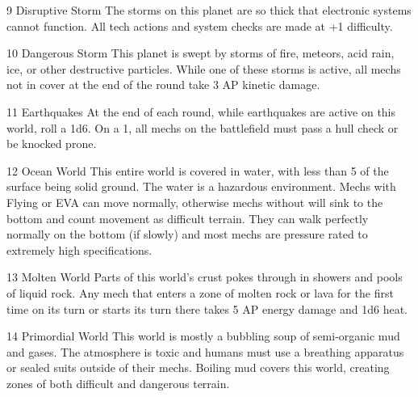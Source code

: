 9       Disruptive Storm                   The storms on this planet are so thick that electronic
                                            systems cannot function. All tech actions and system
                                            checks are made at +1 difficulty.

10      Dangerous Storm                    This planet is swept by storms of fire, meteors, acid
                                            rain, ice, or other destructive particles. While one of
                                           these storms is active, all mechs not in cover at the end
                                            of the round take 3 AP kinetic damage.

11      Earthquakes                        At the end of each round, while earthquakes are active
                                            on this world, roll a 1d6. On a 1, all mechs on the
                                            battlefield must pass a hull check or be knocked prone.

12      Ocean World                        This entire world is covered in water, with less than 5%
                                            of the surface being solid ground. The water is a
                                            hazardous environment. Mechs with Flying or EVA can
                                            move normally, otherwise mechs without will sink to the
                                            bottom and count movement as difficult terrain. They
                                            can walk perfectly normally on the bottom (if slowly)
                                            and most mechs are pressure rated to extremely high
                                            specifications.

13      Molten World                        Parts of this world's crust pokes through in showers
                                            and pools of liquid rock. Any mech that enters a zone of
                                            molten rock or lava for the first time on its turn or starts
                                            its turn there takes 5 AP energy damage and 1d6 heat.

14      Primordial World                   This world is mostly a bubbling soup of semi-organic
                                            mud and gases. The atmosphere is toxic and humans
                                            must use a breathing apparatus or sealed suits outside
                                            of their mechs. Boiling mud covers this world, creating
                                            zones of both difficult and dangerous terrain.

